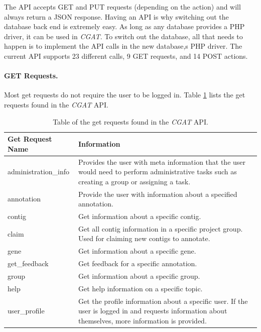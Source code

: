 \documentclass[12pt]{ucthesis}
\begin{document}
The API accepts GET and PUT requests (depending on the action) and will always return a JSON response.
Having an API is why switching out the database back end is extremely easy. 
As long as any database provides a PHP driver, it can be used in \textit{CGAT}. To switch out
the database, all that needs to happen is to implement the API calls in the new database,s PHP driver.
The current API supports 23 different calls, 9 GET requests, and 14 POST actions.

\paragraph{GET Requests.}
Most get requests do not require the user to be logged in. Table \ref{tab:get_requests} lists
the get requests found in the \textit{CGAT} API.

\begin{table}[H]
   \centering
      \begin{tabular}{| l | p{10cm} |}
         \hline
            {\textbf{Get Request Name}} &
            {\textbf{Information}} \\
         \hline
            administration\_info & Provides the user with meta information that the user would need to perform administrative tasks such as creating a group or assigning a task. \\
         \hline
            annotation           & Provide the user with information about a specified annotation.  \\
         \hline
            contig  & Get information about a specific contig.  \\
         \hline
            claim      & Get all contig information in a specific project group. Used for claiming new contigs to annotate.  \\
         \hline
            gene           & Get information about a specific gene. \\
         \hline
            get\_feedback           & Get feedback for a specific annotation. \\
         \hline
            group              & Get information about a specific group. \\
         \hline
            help              & Get help information on a specific topic. \\
         \hline
            user\_profile              & Get the profile information about a specific user. If the user is logged in and requests information about themselves, more information is provided. \\
         \hline
      \end{tabular}
      \caption{Table of the get requests found in the \textit{CGAT} API.}
      \label{tab:get_requests}
\end{table}
\end{document}
